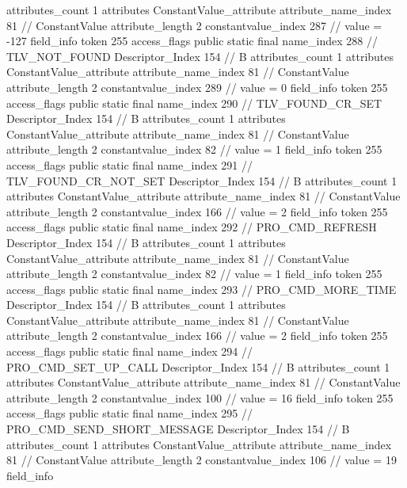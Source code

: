{{{{{				attributes_count	1
				attributes {
				ConstantValue_attribute {
					attribute_name_index	81		// ConstantValue
					attribute_length	2
					constantvalue_index	287		// value = -127
				}
				}
			}
			field_info {
				token	255
				access_flags	public static final
				name_index	288		// TLV_NOT_FOUND
				Descriptor_Index	154		// B
				attributes_count	1
				attributes {
				ConstantValue_attribute {
					attribute_name_index	81		// ConstantValue
					attribute_length	2
					constantvalue_index	289		// value = 0
				}
				}
			}
			field_info {
				token	255
				access_flags	public static final
				name_index	290		// TLV_FOUND_CR_SET
				Descriptor_Index	154		// B
				attributes_count	1
				attributes {
				ConstantValue_attribute {
					attribute_name_index	81		// ConstantValue
					attribute_length	2
					constantvalue_index	82		// value = 1
				}
				}
			}
			field_info {
				token	255
				access_flags	public static final
				name_index	291		// TLV_FOUND_CR_NOT_SET
				Descriptor_Index	154		// B
				attributes_count	1
				attributes {
				ConstantValue_attribute {
					attribute_name_index	81		// ConstantValue
					attribute_length	2
					constantvalue_index	166		// value = 2
				}
				}
			}
			field_info {
				token	255
				access_flags	public static final
				name_index	292		// PRO_CMD_REFRESH
				Descriptor_Index	154		// B
				attributes_count	1
				attributes {
				ConstantValue_attribute {
					attribute_name_index	81		// ConstantValue
					attribute_length	2
					constantvalue_index	82		// value = 1
				}
				}
			}
			field_info {
				token	255
				access_flags	public static final
				name_index	293		// PRO_CMD_MORE_TIME
				Descriptor_Index	154		// B
				attributes_count	1
				attributes {
				ConstantValue_attribute {
					attribute_name_index	81		// ConstantValue
					attribute_length	2
					constantvalue_index	166		// value = 2
				}
				}
			}
			field_info {
				token	255
				access_flags	public static final
				name_index	294		// PRO_CMD_SET_UP_CALL
				Descriptor_Index	154		// B
				attributes_count	1
				attributes {
				ConstantValue_attribute {
					attribute_name_index	81		// ConstantValue
					attribute_length	2
					constantvalue_index	100		// value = 16
				}
				}
			}
			field_info {
				token	255
				access_flags	public static final
				name_index	295		// PRO_CMD_SEND_SHORT_MESSAGE
				Descriptor_Index	154		// B
				attributes_count	1
				attributes {
				ConstantValue_attribute {
					attribute_name_index	81		// ConstantValue
					attribute_length	2
					constantvalue_index	106		// value = 19
				}
				}
			}
			field_info {
}}}}}
